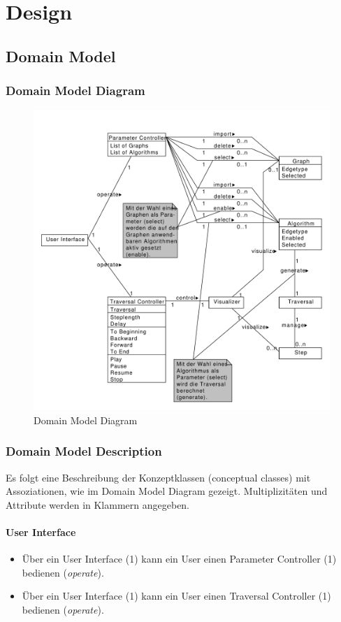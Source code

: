 \chapter{Design}
% 
\section{Domain Model}
\label{sec:Domain Model}
% 
\subsection{Domain Model Diagram}
\label{subsec:Domain Model Diagram}
\begin{figure}[H]
    \includegraphics[totalheight=0.6\textheight]{diagrams/domain-model-diagram.pdf}
    \caption{Domain Model Diagram}
    \label{fig:domain_model_diagram}
\end{figure}
% 
\subsection{Domain Model Description}
\label{subsec:Domain Model Description}
Es folgt eine Beschreibung der Konzeptklassen (conceptual classes) mit Assoziationen, wie im Domain Model Diagram gezeigt. Multiplizit\"aten und Attribute werden in Klammern angegeben.
% 
\subsubsection{User Interface}
\label{subsubsec:User Interface}
\begin{itemize}
  \item \"Uber ein User Interface (1) kann ein User einen Parameter Controller (1) bedienen (\textit{operate}).
  \item \"Uber ein User Interface (1) kann ein User einen Traversal Controller (1) bedienen (\textit{operate}).
\end{itemize}
% 
